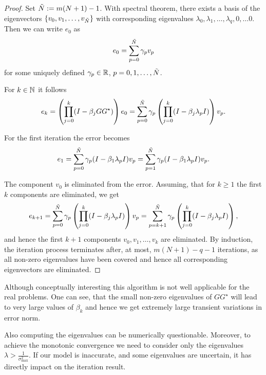 \begin{proof} 
	Set $\tilde{N} := m(N+1) - 1$. With spectral theorem, there exists a basis of the eigenvectors $\{v_0, v_1, \dots, v_{\tilde{N}}\}$ with corresponding eigenvalues $\lambda_0, \lambda_1, \dots, \lambda_q, 0, \dots 0$. 
	Then we can write $e_0$ as 
	\begin{align}
	e_0 = \sum_{p = 0}^{\tilde{N}} \gamma_p v_p
	\end{align}
	for some uniquely defined $\gamma_p \in {\mathbb{R}}$, $p = 0, 1, \dots, \tilde{N}$. 
	
	For $k \in {\mathbb{N}}$ it follows 
	\begin{align}
	e_k = \left(\prod_{j=0}^k(I - \beta_j G G^\star)\right)e_0 = \sum_{p = 0}^{\tilde{N}} \gamma_p \left(\prod_{j=0}^k (I - \beta_j \lambda_p I)\right)v_p.
	\end{align}
	
	For the first iteration the error becomes 
	\begin{align}
	e_1 = \sum_{p = 0}^{\tilde{N}} \gamma_p ( I - \beta_1 \lambda_p I) v_p = \sum_{p=1}^{\tilde{N} } \gamma_p ( I - \beta_1 \lambda_p I) v_p.
	\end{align}
	
	The component $v_0$ is eliminated from the error.
	Assuming, that for $k \geq 1$ the first $k$ components are eliminated, we get 
	\begin{align}
	e_{k+1} = \sum_{p = 0}^{\tilde{N}} \gamma_p \left(\prod_{j=0}^k (I - \beta_j \lambda_p I)\right)v_p = \sum_{p = k + 1}^{\tilde{N}} \gamma_p \left(\prod_{j = 0}^k (I - \beta_j \lambda_p I )\right),
	\end{align}
	and hence the first $k+1$ components $v_0, v_1, \dots, v_k$ are eliminated. 
	By induction, the iteration process terminates after, at most,  $m(N+1) - q - 1$ iterations, as all non-zero eigenvalues have been covered and hence all corresponding eigenvectors are eliminated.	
\end{proof}

Although conceptually interesting this algorithm is not well applicable for the real problems. One can see, that the small non-zero eigenvalues of $GG^\star$ will lead to very large values of $\beta_k$ and hence we get extremely large transient variations in error norm. 

Also computing the eigenvalues can be numerically questionable. Moreover, to achieve the monotonic convergence we need to consider only the eigenvalues $\lambda > \frac{1}{\sigma_{\max}^2}$.
If our model is inaccurate, and some eigenvalues are uncertain, it has directly impact on the iteration result. 

